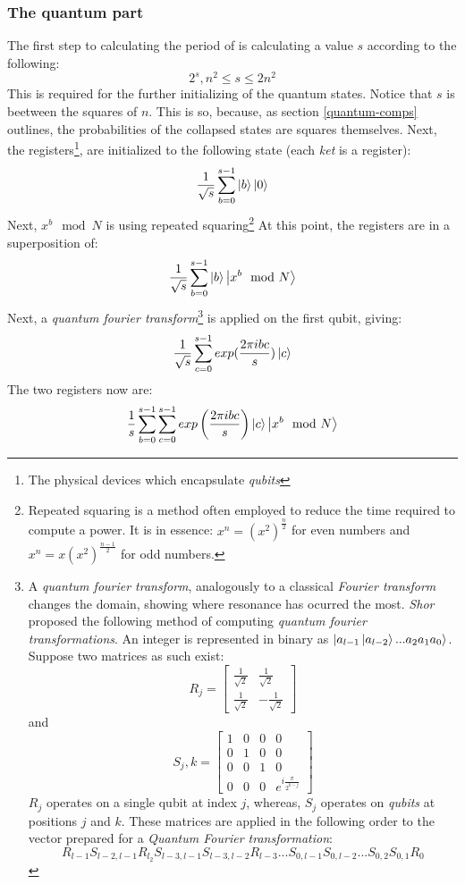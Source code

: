 \documentclass[a4paper, 10pt]{article}
\begin{document}
\subsubsection{The quantum part} \label{quantum-shor}
The first step to calculating the period of is calculating a value $s$ according to the following:
$$2^{s}, n^2 \leq s \leq 2n^2$$
This is required for the further initializing of the quantum states. Notice that $s$ is beetween the squares of $n$. 
This is so, because, as section \ref{quantum-comps} outlines, the probabilities of the collapsed states are squares 
themselves. Next, the registers\footnote{The physical devices which encapsulate \textit{qubits}}, are initialized to 
the following state (each \textit{ket} is a register):
$$\frac{1}{\sqrt{s}} \sum_{b = 0}^{s - 1} \ket{b} \ket{0}$$
Next, $x^b \mod N$ is using repeated squaring\footnote{Repeated squaring is a method often employed to reduce the time 
required to compute a power. It is in essence: $x^n = (x^2)^\frac{n}{2}$ for even numbers and 
$x^n = x(x^2)^\frac{n-1}{2}$ for odd numbers.}
At this point, the registers are in a superposition of:
$$\frac{1}{\sqrt{s}} \sum_{b = 0}^{s - 1} \ket{b} \ket{x^b \mod N}$$
Next, a \textit{quantum fourier transform}\footnote{A \textit{quantum fourier transform}, analogously to a classical 
\textit{Fourier transform} changes the domain, showing where resonance has ocurred the most. \textit{Shor} proposed 
the following method of computing \textit{quantum fourier transformations}. An integer is represented in binary as 
$\ket{a_{l-1} \ket{a_{l-2}} ... a_2 a_1 a_0}$. Suppose two matrices as such exist:
$$R_j =
\begin{bmatrix}
\frac{1}{\sqrt{2}} & \frac{1}{\sqrt{2}} \\
\frac{1}{\sqrt{2}} & - \frac{1}{\sqrt{2}}
\end{bmatrix}$$
and
$$S_j, k = 
\begin{bmatrix}
1 & 0 & 0 & 0 \\
0 & 1 & 0 & 0 \\
0 & 0 & 1 & 0 \\
0 & 0 & 0 & e^{i\frac{\pi}{2^{k - j}}}
\end{bmatrix}$$
$R_j$ operates on a single qubit at index $j$, whereas, $S_j$ operates on \textit{qubits} at positions $j$ and $k$.
These matrices are applied in the following order to the vector prepared for a \textit{Quantum Fourier transformation}:
$$R_{l-1} S_{l-2, l-1} R_{l_2} S_{l-3, l-1} S_{l-3, l-2} R_{l-3} ... S_{0, l-1} S_{0, l-2} ... S_{0, 2} S_{0, 1} R_0$$
} is applied on the first qubit, giving:
$$\frac{1}{\sqrt{s}} \sum_{c = 0}^{s - 1} exp(\frac{2 \pi i bc}{s}) \ket{c}$$
The two registers now are:
$$\frac{1}{s} \sum_{b = 0}^{s - 1} \sum_{c = 0}^{s - 1} exp \left(\frac{2 \pi i bc}{s} \right) \ket{c} \ket{x^b \mod N}
$$
\end{document}
